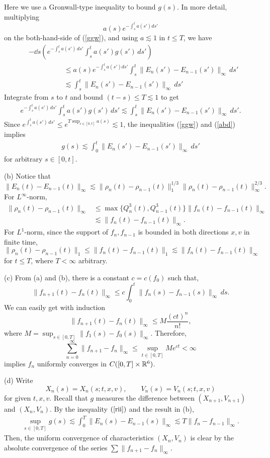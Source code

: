\documentclass[12pt]{article}
\begin{document}
\begin{pf}
Here we use a Gronwall-type inequality to bound $g(s)$.
In more detail, multiplying
\[a(s)e^{-\int_s^ta(s')ds'}\]
on the both-hand-side of (\ref{ggw}), and using $a\lesssim 1$ in $t\le T$, we have
\begin{align*}
&-\dd{s}\left(e^{-\int_s^ta(s')\,ds'}\int_s^ta(s')g(s')\,ds'\right)\\
&\hspace{5em}\le a(s)e^{-\int_s^ta(s')ds'}\int_s^t\|E_n(s')-E_{n-1}(s')\|_\infty\,ds'\\
&\hspace{5em}\lesssim\int_s^t\|E_n(s')-E_{n-1}(s')\|_\infty\,ds'
\end{align*}
Integrate from $s$ to $t$ and bound $(t-s)\le T\lesssim1$ to get
\begin{align}\label{abd}
e^{-\int_s^ta(s')\,ds'}\int_s^ta(s')g(s')\,ds'\lesssim\int_s^t\|E_n(s')-E_{n-1}(s')\|_\infty\,ds'.
\end{align}
Since $e^{\int_s^ta(s')\,ds'}\le e^{T\sup_{s\in[0,t]}a(s)}\lesssim1$, the inequalities (\ref{ggw}) and (\ref{abd}) implies
\begin{align}\label{rii}
g(s)\lesssim\int_0^t\|E_n(s')-E_{n-1}(s')\|_\infty\,ds'
\end{align}
for arbitrary $s\in[0,t]$.

(b)
Notice that
\[\|E_n(t)-E_{n-1}(t)\|_\infty\lesssim\|\rho_n(t)-\rho_{n-1}(t)\|_1^{1/3}\|\rho_n(t)-\rho_{n-1}(t)\|_\infty^{2/3}.\]
For $L^\infty$-norm,
\begin{align*}
\|\rho_n(t)-\rho_{n-1}(t)\|_\infty
&\le\max\{Q_n^3(t),Q_{n-1}^3(t)\}\|f_n(t)-f_{n-1}(t)\|_\infty\\
&\lesssim\|f_n(t)-f_{n-1}(t)\|_\infty.
\end{align*}
For $L^1$-norm, since the support of $f_n,f_{n-1}$ is bounded in both directions $x,v$ in finite time,
\[\|\rho_n(t)-\rho_{n-1}(t)\|_1\le\|f_n(t)-f_{n-1}(t)\|_1\lesssim\|f_n(t)-f_{n-1}(t)\|_\infty\]
for $t\le T$, where $T<\infty$ arbitrary.

(c)
From (a) and (b), there is a constant $c=c(f_0)$ such that,
\[\|f_{n+1}(t)-f_n(t)\|_\infty\le c\int_0^t\|f_n(s)-f_{n-1}(s)\|_\infty\,ds.\]
We can easily get with induction
\[\|f_{n+1}(t)-f_n(t)\|_\infty\le M\frac{(ct)^n}{n!},\]
where $M=\sup_{s\in[0,T]}\|f_1(s)-f_0(s)\|_\infty$.
Therefore,
\[\sum_{n=0}^\infty\|f_{n+1}-f_n\|_\infty\le\sup_{t\in[0,T]}Me^{ct}<\infty\]
implies $f_n$ uniformly converges in $C([0,T]\times\mathbb{R}^6)$.

(d)
Write
\[X_n(s)=X_n(s;t,x,v),\qquad V_n(s)=V_n(s;t,x,v)\]
for given $t,x,v$.
Recall that $g$ measures the difference between $(X_{n+1},V_{n+1})$ and $(X_n,V_n)$.
By the inequality $(\ref{rii})$ and the result in (b),
\begin{align*}
\sup_{s\in[0,T]}g(s)\lesssim\int_0^T\|E_n(s)-E_{n-1}(s)\|_\infty\lesssim T\|f_n-f_{n-1}\|_\infty.
\end{align*}
Then, the uniform convergence of characteristics $(X_n,V_n)$ is clear by the absolute convergence of the series $\sum\|f_{n+1}-f_n\|_\infty$.


\end{pf}
\end{document}
